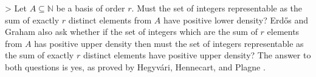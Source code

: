 > Let $A\subseteq \mathbb{N}$ be a basis of order $r$. Must the set of integers representable as the sum of exactly $r$ distinct elements from $A$ have positive lower density? Erd\H{o}s and Graham also ask whether if the set of integers which are the sum of $r$ elements from $A$ has positive upper density then must the set of integers representable as the sum of exactly $r$ distinct elements have positive upper density? The answer to both questions is yes, as proved by Hegyv\'{a}ri, Hennecart, and Plagne \cite{HHP03}.